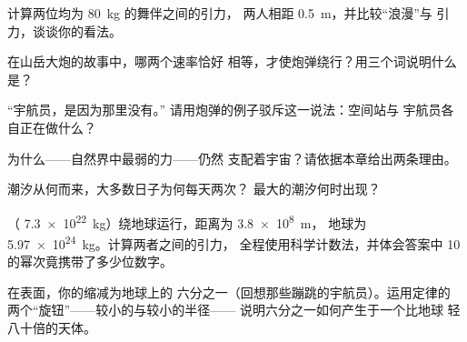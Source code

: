 \begin{exercise}[$\star$]\label{exo:g9:gravitation:4}
计算两位均为 \qty{80}{kg} 的舞伴之间的引力，
两人相距 \qty{0.5}{m}，并比较“浪漫”与
引力，谈谈你的看法。
\end{exercise}

\begin{exercise}[$\star$]\label{exo:g9:gravitation:5}
在山岳大炮的故事中，哪两个速率恰好
相等，才使炮弹绕行？用三个词说明什么是？
\end{exercise}

\begin{exercise}[$\star$]\label{exo:g9:gravitation:6}
“宇航员，是因为那里没有。”
请用炮弹的例子驳斥这一说法：空间站与
宇航员各自正在做什么？
\end{exercise}

\begin{exercise}[$\star$]\label{exo:g9:gravitation:7}
为什么——自然界中最弱的力——仍然
支配着宇宙？请依据本章给出两条理由。
\end{exercise}

\begin{exercise}[$\star$]\label{exo:g9:gravitation:8}
潮汐从何而来，大多数日子为何每天两次？
最大的潮汐何时出现？
\end{exercise}

\begin{exercise}[$\star\star$]\label{exo:g9:gravitation:9}
（ \qty{7.3e22}{kg}）绕地球运行，距离为 \qty{3.8e8}{m}，
地球为 \qty{5.97e24}{kg}。计算两者之间的引力，
全程使用科学计数法，并体会答案中
10 的幂次竟携带了多少位数字。
\end{exercise}

\begin{exercise}[$\star\star$]\label{exo:g9:gravitation:10}
在表面，你的缩减为地球上的
六分之一（回想那些蹦跳的宇航员）。运用定律的
两个“旋钮”——较小的与较小的半径——
说明六分之一如何产生于一个比地球
轻八十倍的天体。
\end{exercise}

